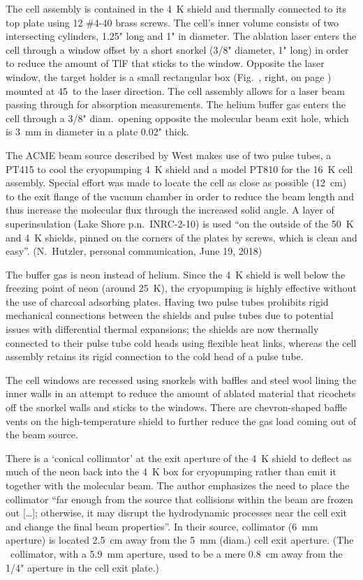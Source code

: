 The cell assembly is contained in the 4~K shield and thermally connected to its
top plate using 12 \#4-40 brass screws. The cell's inner volume consists of two
intersecting cylinders, 1.25" long and 1" in diameter. The ablation laser enters
the cell through a window offset by a short snorkel (3/8" diameter, 1" long) in
order to reduce the amount of TlF that sticks to the window. Opposite the laser
window, the target holder is a small rectangular box (Fig.~,
right, on page \pageref{oldsetup}) mounted at 45\deg\ to the laser direction.
The cell assembly allows for a laser beam passing through for absorption
measurements. The helium buffer gas enters the cell through a 3/8" diam.\
opening opposite the molecular beam exit hole, which is 3~mm in diameter in a
plate 0.02" thick.

The ACME beam source described by West \cite[sect~5.1]{west2017thesis} makes use
of two pulse tubes, a PT415 to cool the cryopumping 4~K shield and a model PT810
for the 16~K cell assembly. Special effort was made to locate the cell as close
as possible (12~cm) to the exit flange of the vacuum chamber in order to reduce
the beam length and thus increase the molecular flux through the increased solid
angle. A layer of superinsulation (Lake Shore p.n.\ INRC-2-10) is used ``on the
outside of the 50~K and 4~K shields, pinned on the corners of the plates by
screws, which is clean and easy''. (N.\ Hutzler, personal communication, June
19, 2018)

The buffer gas is neon instead of helium. Since the 4~K shield is well below the
freezing point of neon (around 25~K), the cryopumping is highly effective
without the use of charcoal adsorbing plates. Having two pulse tubes prohibits
rigid mechanical connections between the shields and pulse tubes due to
potential issues with differential thermal expansions; the shields are now
thermally connected to their pulse tube cold heads using flexible heat links,
whereas the cell assembly retains its rigid connection to the cold head of a
pulse tube.

The cell windows are recessed using snorkels with baffles and steel wool lining
the inner walls in an attempt to reduce the amount of ablated material that
ricochets off the snorkel walls and sticks to the windows. There are
chevron-shaped baffle vents on the high-temperature shield to further reduce the
gas load coming out of the beam source.

There is a `conical collimator' at the exit aperture of the 4~K shield to
deflect as much of the neon back into the 4~K box for cryopumping rather than
emit it together with the molecular beam. The author emphasizes the need to
place the collimator ``far enough from the source that collisions within the
beam are frozen out [\ldots]; otherwise, it may disrupt the hydrodynamic
processes near the cell exit and change the final beam properties''.
\cite[p.~109]{west2017thesis} In their source, collimator (6~mm aperture) is
located 2.5~cm away from the 5~mm (diam.) cell exit aperture. (The \CENTREX\
collimator, with a 5.9~mm aperture, used to be a mere 0.8~cm away from the 1/4"
aperture in the cell exit plate.)

